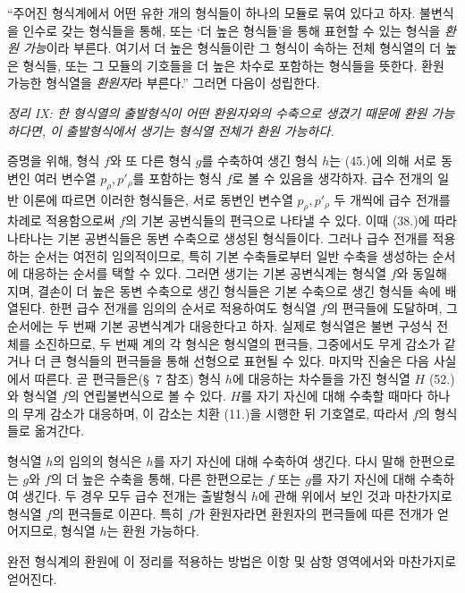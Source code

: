 “주어진 형식계에서 어떤 유한 개의 형식들이 하나의 모듈로 묶여 있다고 하자. 불변식을 인수로 갖는 형식들을 통해, 또는 ‘더 높은 형식들’을 통해 표현할 수 있는 형식을 \emph{환원 가능}이라 부른다. 여기서 더 높은 형식들이란 그 형식이 속하는 전체 형식열의 더 높은 형식들, 또는 그 모듈의 기호들을 더 높은 차수로 포함하는 형식들을 뜻한다. 환원 가능한 형식열을 \emph{환원자}라 부른다.” 그러면 다음이 성립한다.

\emph{정리 IX: 한 형식열의 출발형식이 어떤 환원자와의 수축으로 생겼기 때문에 환원 가능하다면, 이 출발형식에서 생기는 형식열 전체가 환원 가능하다.}

증명을 위해, 형식 $f$와 또 다른 형식 $g$를 수축하여 생긴 형식 $h$는 (45.)에 의해 서로 동변인 여러 변수열 $p_\rho,p'_\rho$를 포함하는 형식 $f$로 볼 수 있음을 생각하자. 급수 전개의 일반 이론에 따르면 이러한 형식들은, 서로 동변인 변수열 $p_\rho,p'_\rho$ 두 개씩에 급수 전개를 차례로 적용함으로써 $f$의 기본 공변식들의 편극으로 나타낼 수 있다. 이때 (38.)에 따라 나타나는 기본 공변식들은 동변 수축으로 생성된 형식들이다. 그러나 급수 전개를 적용하는 순서는 여전히 임의적이므로, 특히 기본 수축들로부터 일반 수축을 생성하는 순서에 대응하는 순서를 택할 수 있다. 그러면 생기는 기본 공변식계는 형식열 $f$와 동일해지며, 결손이 더 높은 동변 수축으로 생긴 형식들은 기본 수축으로 생긴 형식들 속에 배열된다. 한편 급수 전개를 임의의 순서로 적용하여도 형식열 $f$의 편극들에 도달하며, 그 순서에는 두 번째 기본 공변식계가 대응한다고 하자. 실제로 형식열은 불변 구성식 전체를 소진하므로, 두 번째 계의 각 형식은 형식열의 편극들, 그중에서도 무게 감소가 같거나 더 큰 형식들의 편극들을 통해 선형으로 표현될 수 있다. 마지막 진술은 다음 사실에서 따른다. 곧 편극들은(\S\ 7 참조) 형식 $h$에 대응하는 차수들을 가진 형식열 $H$ (52.)와 형식열 $f$의 연립불변식으로 볼 수 있다. $H$를 자기 자신에 대해 수축할 때마다 하나의 무게 감소가 대응하며, 이 감소는 치환 (11.)을 시행한 뒤 기호열로, 따라서 $f$의 형식들로 옮겨간다.

형식열 $h$의 임의의 형식은 $h$를 자기 자신에 대해 수축하여 생긴다. 다시 말해 한편으로는 $g$와 $f$의 더 높은 수축을 통해, 다른 한편으로는 $f$ 또는 $g$를 자기 자신에 대해 수축하여 생긴다. 두 경우 모두 급수 전개는 출발형식 $h$에 관해 위에서 보인 것과 마찬가지로 형식열 $f$의 편극들로 이끈다. 특히 $f$가 환원자라면 환원자의 편극들에 따른 전개가 얻어지므로, 형식열 $h$는 환원 가능하다.

완전 형식계의 환원에 이 정리를 적용하는 방법은 이항 및 삼항 영역에서와 마찬가지로 얻어진다.
